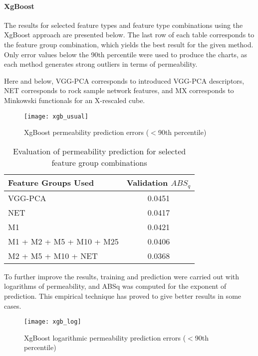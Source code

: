 \documentclass[review]{elsarticle}
\begin{document}
\paragraph{XgBoost}

The results for selected feature types and feature type combinations using the XgBoost approach are presented below. The last row of each table corresponds to the feature group combination, which yields the best result for the given method. Only error values below the 90th percentile were used to produce the charts, as each method generates strong outliers in terms of permeability. 

Here and below, VGG-PCA corresponds to introduced VGG-PCA descriptors, NET corresponds to rock sample network features, and MX corresponds to Minkowski functionals for an X-rescaled cube.

\begin{figure}[H]
    \centering
    \texttt{[image: xgb\_usual]}
    \caption{XgBoost permeability prediction errors ($<$90th percentile)}
\end{figure}

\begin{table}[H]
  \centering
  \caption{Evaluation of permeability prediction for selected feature group combinations} \label{tab:tab3}
  \begin{tabular}{ | l | c | }
    \hline
    Feature Groups Used & Validation $ABS_q$ \\ \hline
    VGG-PCA & 0.0451 \\ \hline
    NET & 0.0417 \\ \hline
    M1 & 0.0421 \\ \hline
    M1 + M2 + M5 + M10 + M25 & 0.0406 \\ \hline
    M2 + M5 + M10 + NET & 0.0368 \\ \hline
  \end{tabular}
\end{table}

To further improve the results, training and prediction were carried out with logarithms of permeability, and ABSq was computed for the exponent of prediction. This empirical technique has proved to give better results in some cases.

\begin{figure}[H]
    \centering
    \texttt{[image: xgb\_log]}
    \caption{XgBoost logarithmic permeability prediction errors ($<$90th percentile)}
\end{figure}
\end{document}
